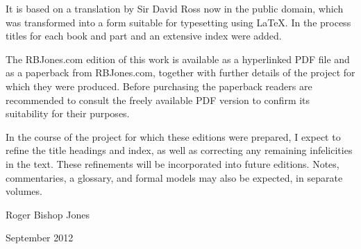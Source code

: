 It is based on a translation by Sir David Ross now in the public domain, which was transformed into a form suitable for typesetting using {\LaTeX}.
In the process titles for each book and part and an extensive index were added.

The RBJones.com edition of this work is available as a hyperlinked PDF file and as a paperback from RBJones.com, together with further details of the project for which they were produced.
Before purchasing the paperback readers are recommended to consult the freely available PDF version to confirm its suitability for their purposes.

In the course of the project for which these editions were prepared, I expect to refine the title headings and index, as well as correcting any remaining infelicities in the text.
These refinements will be incorporated into future editions.
Notes, commentaries, a glossary, and formal models may also be expected, in separate volumes.

Roger Bishop Jones

September 2012

\mainmatter

\renewcommand{\aref}{\thechapter\ Part \arabic{section}}



\backmatter
%
%




\renewcommand{\aref}{}
\renewcommand{\bookname}{}
\renewcommand{\chaptermark}[1]{}
\renewcommand{\sectionmark}[1]{}

\printindex

\vfil



